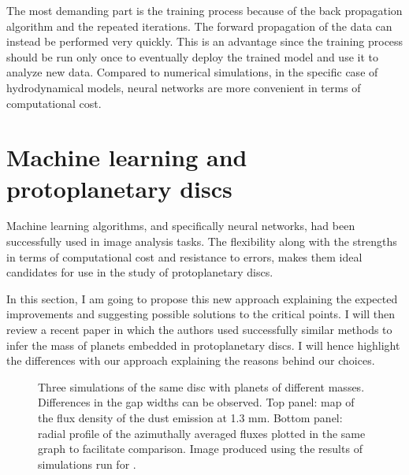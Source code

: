 \documentclass[a4paper,10pt]{report}
\begin{document}
The most demanding part is the training process because of the back propagation 
algorithm and the repeated iterations.
The forward propagation of the data can instead be performed  very quickly.
This is an advantage since the training process should be run only once to eventually deploy the trained model
and use it to analyze new data. Compared to numerical simulations, in the specific case of hydrodynamical models, 
neural networks are more convenient in terms of computational cost.

\section{Machine learning and protoplanetary discs}

Machine learning algorithms, and specifically neural networks, had been successfully used in image analysis tasks.
The flexibility along with the strengths in terms of computational cost and resistance to 
errors, makes them ideal candidates for use in the study of protoplanetary discs.

In this section, I am going to propose this new approach explaining the expected improvements and 
suggesting possible solutions to the critical points. I will then review a recent paper in which the 
authors used successfully similar methods to infer the mass of planets embedded in protoplanetary discs.
I will hence highlight the differences with our approach explaining the reasons behind our choices.

\begin{figure}
    \begin{center}
        \scalebox{0.5}{}
        \scalebox{0.6}{}
    \end{center}
    \caption{Three simulations of the same disc with planets of different masses.
    Differences in the gap widths can be observed.
    Top panel: map of the flux density of the dust emission at 1.3 mm. Bottom panel:
    radial profile of the azimuthally averaged fluxes plotted in the same graph to facilitate comparison.
    Image produced using the results of simulations run for \cite{dstauv}.}
\end{figure}
\end{document}
